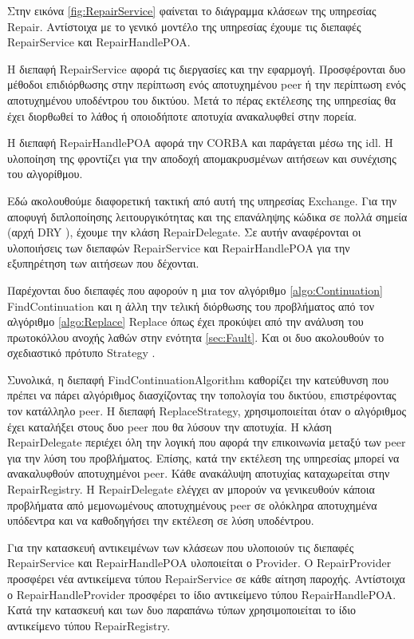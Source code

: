 Στην εικόνα \ref{fig:RepairService} φαίνεται το διάγραμμα κλάσεων της υπηρεσίας 
Repair. Αντίστοιχα με το γενικό μοντέλο της υπηρεσίας έχουμε τις 
διεπαφές RepairService και RepairHandlePOA. 

Η διεπαφή RepairService αφορά τις διεργασίες και την εφαρμογή. 
Προσφέρονται δυο μέθοδοι επιδιόρθωσης στην περίπτωση ενός αποτυχημένου 
peer ή την περίπτωση ενός αποτυχημένου υποδέντρου του δικτύου. Μετά το 
πέρας εκτέλεσης της υπηρεσίας θα έχει διορθωθεί το λάθος ή οποιοδήποτε 
αποτυχία ανακαλυφθεί στην πορεία.

Η διεπαφή RepairHandlePOA αφορά την CORBA και παράγεται μέσω της idl. Η 
υλοποίηση της φροντίζει για την αποδοχή απομακρυσμένων αιτήσεων και 
συνέχισης του αλγορίθμου.

Εδώ ακολουθούμε διαφορετική τακτική από αυτή της υπηρεσίας Exchange. Για 
την αποφυγή διπλοποίησης λειτουργικότητας και της επανάληψης κώδικα σε 
πολλά σημεία (αρχή DRY \citep{Pragmatic1999} ), 
έχουμε την κλάση RepairDelegate. Σε αυτήν αναφέρονται οι υλοποιήσεις των 
διεπαφών RepairService και RepairHandlePOA για την εξυπηρέτηση των 
αιτήσεων που δέχονται. 

Παρέχονται δυο διεπαφές που αφορούν η μια τον αλγόριθμο \ref{algo:Continuation} 
FindContinuation και η άλλη την τελική διόρθωσης του προβλήματος 
από τον αλγόριθμο \ref{algo:Replace} Replace όπως έχει προκύψει από την 
ανάλυση του πρωτοκόλλου ανοχής λαθών στην ενότητα \ref{sec:Fault}. 
Και οι δυο ακολουθούν το σχεδιαστικό πρότυπο Strategy \citep{GoF}.

Συνολικά, η διεπαφή FindContinuationAlgorithm καθορίζει την κατεύθυνση που 
πρέπει να πάρει αλγόριθμος διασχίζοντας την τοπολογία του δικτύου, 
επιστρέφοντας τον κατάλληλο peer. Η διεπαφή ReplaceStrategy, 
χρησιμοποιείται όταν ο αλγόριθμος έχει καταλήξει στους δυο peer που θα 
λύσουν την αποτυχία. Η κλάση RepairDelegate περιέχει όλη την λογική που 
αφορά την επικοινωνία μεταξύ των peer για την λύση του προβλήματος. 
Επίσης, κατά την εκτέλεση της υπηρεσίας μπορεί να ανακαλυφθούν 
αποτυχημένοι peer. Κάθε ανακάλυψη αποτυχίας καταχωρείται στην 
RepairRegistry. Η RepairDelegate ελέγχει αν μπορούν να γενικευθούν 
κάποια προβλήματα από μεμονωμένους αποτυχημένους peer σε ολόκληρα 
αποτυχημένα υπόδεντρα και να καθοδηγήσει την εκτέλεση σε λύση 
υποδέντρου.

Για την κατασκευή αντικειμένων των κλάσεων που υλοποιούν τις διεπαφές 
RepairService και RepairHandlePOA υλοποιείται ο Provider. Ο RepairProvider 
προσφέρει νέα αντικείμενα τύπου RepairService σε κάθε αίτηση παροχής. 
Αντίστοιχα ο RepairHandleProvider προσφέρει το ίδιο αντικείμενο τύπου 
RepairHandlePOA. Κατά την κατασκευή και των δυο παραπάνω τύπων 
χρησιμοποιείται το ίδιο αντικείμενο τύπου RepairRegistry.

